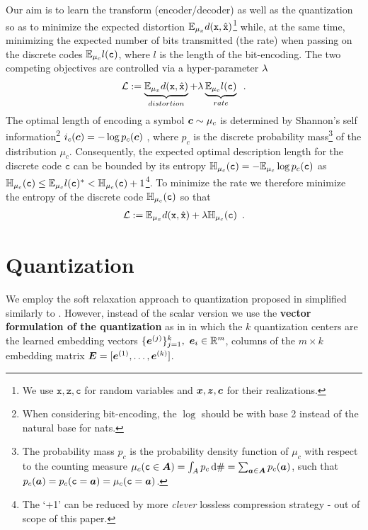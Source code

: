 \documentclass{article} %
\renewcommand{\rvx}{\mathtt{x}}
\renewcommand{\rvc}{\mathtt{c}}
\renewcommand{\rvz}{\mathtt{z}}
\newcommand{\dd}{\, \textnormal{d}}
\newcommand{\pc}{p_c}
\newcommand{\mux}{\mu_x}
\newcommand{\muc}{\mu_c}
\newcommand{\Hc}{\sH_{\muc}}
\begin{document}
Our aim is to learn the transform (encoder/decoder) as well as the quantization so as to minimize the expected distortion $\E_{\mux} d(\rvx, \hat{\rvx})$\footnote{We use $\rvx, \rvz, \rvc$ for random variables and ${\bm{x}}, {\bm{z}}, {\bm{c}}$ for their realizations.} while, at the same time, minimizing the expected number of bits transmitted (the rate) when passing on the discrete codes $\E_{\muc} l(\rvc)$, where $l$ is the length of the bit-encoding.
The two competing objectives are controlled via a hyper-parameter $\lambda$
\begin{align}\label{eq:trade_off}
\Ls := \underbrace{\E_{\mux} d(\rvx, \hat{\rvx})}_{distortion} + \reg \underbrace{\E_{\muc} l(\rvc)}_{rate} \enspace .
\end{align}
The optimal length of encoding a symbol $\vc \sim \muc$ is determined by Shannon's self information\footnote{When considering bit-encoding, the $\log$ should be with base 2 instead of the natural base for nats.} $i_c(\vc) = - \log \pc(\vc)$  \citep{coverElementsInformationTheory2006}, where $\pc$ is the discrete probability mass\footnote{The probability mass $\pc$ is the probability density function of $\muc$ with respect to the counting measure $\muc(\rvc \in \mA) = \int_A \pc \dd \# = \sum_{\va \in \mA} \pc(\va)$, such that $\pc(\va) = \pc(\rvc = \va) = \muc(\rvc = \va)$.} of the distribution $\muc$.
Consequently, the expected optimal description length for the discrete code $\rvc$ can be bounded by its entropy $\Hc(\rvc) = - \E_{\muc} \log \pc(\rvc)$ as $\Hc(\rvc) \leq \E_{\muc} l(\rvc)^* < \Hc(\rvc) + 1$\footnote{The `+1' can be reduced by more \emph{clever} lossless compression strategy - out of scope of this paper.}.
To minimize the rate we therefore minimize the entropy of the discrete code $\Hc(\rvc)$ so that 
\begin{align}\label{eq:loss}
\Ls := \E_{\mux} d(\rvx, \hat{\rvx}) + \reg \Hc(\rvc) \enspace .
\end{align}

\section{Quantization}\label{sec:quantization}

We employ the soft relaxation approach to quantization proposed in \citet{agustssonSofttoHardVectorQuantization2017} simplified similarly to \citet{mentzerConditionalProbabilityModels2018}.
However, instead of the scalar version \citet{mentzerConditionalProbabilityModels2018,habibianVideoCompressionRateDistortion2019} we use the \textbf{vector formulation of the quantization} as in \citet{oordNeuralDiscreteRepresentation2017} in which the $k$ quantization centers are the learned embedding vectors $\{{\bm{e}}^{(j)}\}_{j=1}^k, \ {\bm{e}}_i \in {\mathbb{R}}^m$, columns of the $m \times k$ embedding matrix ${\bm{E}} = [{\bm{e}}^{(1)}, \ldots, {\bm{e}}^{(k)}]$.
\end{document}
